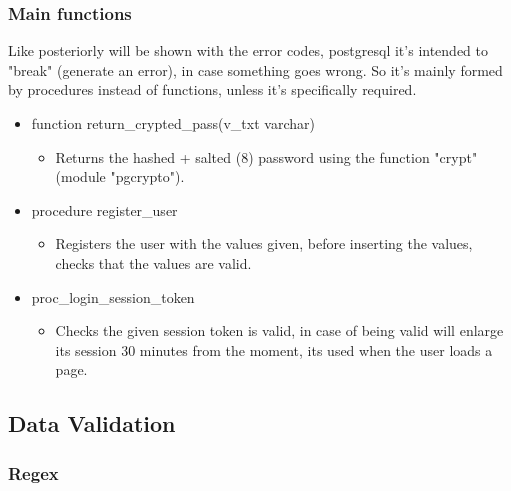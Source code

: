 \subsubsection[Main functions]{Main functions}
\begin{flushleft}
    Like posteriorly will be shown with the error codes, postgresql it's intended to "break" (generate an error), in
    case something goes wrong.
    So it's mainly formed by procedures instead of functions, unless it's specifically required.

    \begin{itemize}
        \item  function return\_crypted\_pass(v\_txt varchar)
        \begin{itemize}
            \item Returns the hashed + salted (8) password using the function "crypt" (module "pgcrypto").
        \end{itemize}
        \item  procedure register\_user
        \begin{itemize}
            \item Registers the user with the values given, before inserting the values, checks that the values are valid.
        \end{itemize}
        \item  proc\_login\_session\_token
        \begin{itemize}
            \item Checks the given session token is valid, in case of being valid will enlarge its session 30 minutes from the moment,
            its used when the user loads a page.
        \end{itemize}
    \end{itemize}
\end{flushleft}


\newpage
\subsection{Data Validation}\label{subsec:data-validation}
\subsubsection[Regex]{Regex}

